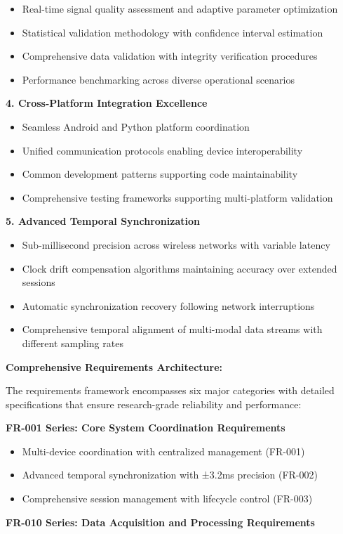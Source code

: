 \documentclass[12pt,a4paper]{report}
\begin{document}
\begin{itemize}
\item Real-time signal quality assessment and adaptive parameter optimization
\item Statistical validation methodology with confidence interval estimation
\item Comprehensive data validation with integrity verification procedures
\item Performance benchmarking across diverse operational scenarios

\end{itemize}
\textbf{4. Cross-Platform Integration Excellence}

\begin{itemize}
\item Seamless Android and Python platform coordination
\item Unified communication protocols enabling device interoperability
\item Common development patterns supporting code maintainability
\item Comprehensive testing frameworks supporting multi-platform validation

\end{itemize}
\textbf{5. Advanced Temporal Synchronization}

\begin{itemize}
\item Sub-millisecond precision across wireless networks with variable latency
\item Clock drift compensation algorithms maintaining accuracy over extended sessions
\item Automatic synchronization recovery following network interruptions
\item Comprehensive temporal alignment of multi-modal data streams with different sampling rates

\end{itemize}
\textbf{Comprehensive Requirements Architecture:}

The requirements framework encompasses six major categories with detailed specifications that ensure research-grade
reliability and performance:

\textbf{FR-001 Series: Core System Coordination Requirements}

\begin{itemize}
\item Multi-device coordination with centralized management (FR-001)
\item Advanced temporal synchronization with ±3.2ms precision (FR-002)
\item Comprehensive session management with lifecycle control (FR-003)

\end{itemize}
\textbf{FR-010 Series: Data Acquisition and Processing Requirements}
\end{document}
